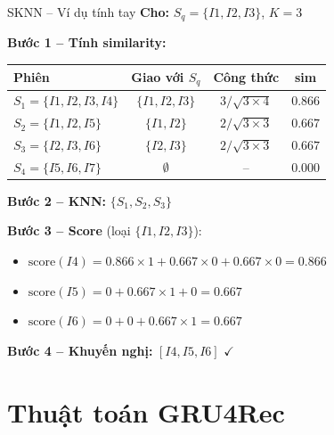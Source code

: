 \documentclass[aspectratio=169, 11pt]{beamer}
\begin{document}
\begin{frame}{SKNN -- Ví dụ tính tay}
\small
\textbf{Cho:} $S_q = \{I1, I2, I3\}$, \; $K = 3$

\vspace{0.2cm}
\textbf{Bước 1 -- Tính similarity:}
\begin{table}
\centering
\footnotesize
\begin{tabular}{lccc}
\toprule
\textbf{Phiên} & \textbf{Giao với $S_q$} & \textbf{Công thức} & \textbf{sim} \\
\midrule
$S_1 = \{I1, I2, I3, I4\}$ & $\{I1, I2, I3\}$ & $3/\sqrt{3 \times 4}$ & $\mathbf{0.866}$ \\
$S_2 = \{I1, I2, I5\}$ & $\{I1, I2\}$ & $2/\sqrt{3 \times 3}$ & $0.667$ \\
$S_3 = \{I2, I3, I6\}$ & $\{I2, I3\}$ & $2/\sqrt{3 \times 3}$ & $0.667$ \\
$S_4 = \{I5, I6, I7\}$ & $\emptyset$ & -- & $0.000$ \\
\bottomrule
\end{tabular}
\end{table}

\textbf{Bước 2 -- KNN:} $\{S_1, S_2, S_3\}$

\vspace{0.1cm}
\textbf{Bước 3 -- Score} (loại $\{I1, I2, I3\}$):
\footnotesize
\begin{itemize}
    \item $\text{score}(I4) = 0.866 \times 1 + 0.667 \times 0 + 0.667 \times 0 = \mathbf{0.866}$
    \item $\text{score}(I5) = 0 + 0.667 \times 1 + 0 = 0.667$
    \item $\text{score}(I6) = 0 + 0 + 0.667 \times 1 = 0.667$
\end{itemize}

\small
\textbf{Bước 4 -- Khuyến nghị:} $[I4, I5, I6]$ \; $\checkmark$
\end{frame}

\section{Thuật toán GRU4Rec}
\end{document}
